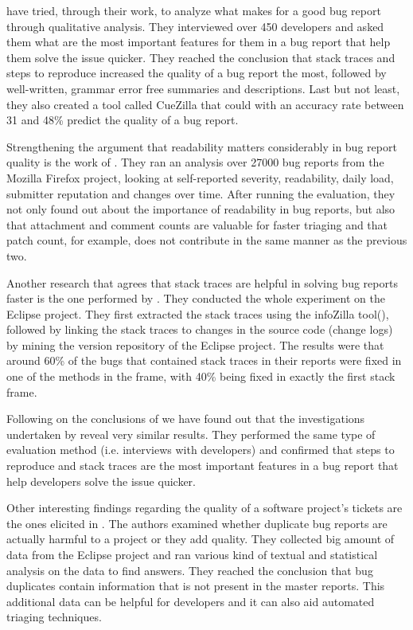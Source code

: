 \documentclass{mprop}
\begin{document}
\citet{bettenburg2008makes} have tried, through their work, to analyze what 
makes for a good bug report through qualitative analysis. They interviewed over
450 developers and asked them what are the most important features for them in
a bug report that help them solve the issue quicker. They reached the conclusion 
that stack traces and steps to reproduce increased the quality of a bug report 
the most, followed by well-written, grammar error free summaries and 
descriptions. Last but not least, they also created a tool called CueZilla that 
could with an accuracy rate between 31 and 48\% predict the quality of a bug 
report. 

Strengthening the argument that readability matters considerably in bug report 
quality is the work of \citet{hooimeijer2007modeling}. They ran an analysis over
27000 bug reports from the Mozilla Firefox project, looking at self-reported 
severity, readability, daily load, submitter reputation and changes over time. 
After running the evaluation, they not only found out about the importance of
readability in bug reports, but also that attachment and comment counts are 
valuable for faster triaging and that patch count, for example, does not
contribute in the same manner as the previous two.

Another research that agrees that stack traces are helpful in solving bug
reports faster is the one performed by \citet{schroter2010stack}. They conducted
the whole experiment on the Eclipse project. They first extracted the stack
traces using the infoZilla tool(\citep{bettenburg2008extracting}), followed by
linking the stack traces to changes in the source code (change logs) by mining
the version repository of the Eclipse project. The results were that 
around 60\% of the bugs that contained stack traces in their reports were fixed
in one of the methods in the frame, with 40\% being fixed in exactly the first
stack frame.

Following on the conclusions of \citet{bettenburg2008makes} we have found out
that the investigations undertaken by \citet{bettenburg2007quality} reveal 
very similar results. They performed the same type of evaluation method (i.e. 
interviews with developers) and confirmed that steps to reproduce and stack traces
are the most important features in a bug report that help developers solve the
issue quicker.

Other interesting findings regarding the quality of a software project's tickets
are the ones elicited in \citet{bettenburg2008duplicate}. The authors examined
whether duplicate bug reports are actually harmful to a project or they add 
quality. They collected big amount of data from the Eclipse project and ran
various kind of textual and statistical analysis on the data to find answers.
They reached the conclusion that bug duplicates contain information that is not
present in the master reports. This additional data can be helpful for developers
and it can also aid automated triaging techniques.
\end{document}
